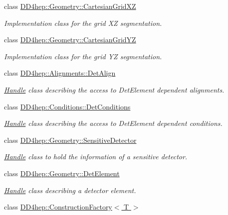 \begin{DoxyCompactItemize}
class \hyperlink{class_d_d4hep_1_1_geometry_1_1_cartesian_grid_x_z}{D\+D4hep\+::\+Geometry\+::\+Cartesian\+Grid\+XZ}
\begin{DoxyCompactList}\small\item\em Implementation class for the grid XZ segmentation. \end{DoxyCompactList}\item 
class \hyperlink{class_d_d4hep_1_1_geometry_1_1_cartesian_grid_y_z}{D\+D4hep\+::\+Geometry\+::\+Cartesian\+Grid\+YZ}
\begin{DoxyCompactList}\small\item\em Implementation class for the grid YZ segmentation. \end{DoxyCompactList}\item 
class \hyperlink{class_d_d4hep_1_1_alignments_1_1_det_align}{D\+D4hep\+::\+Alignments\+::\+Det\+Align}
\begin{DoxyCompactList}\small\item\em \hyperlink{class_d_d4hep_1_1_handle}{Handle} class describing the access to Det\+Element dependent alignments. \end{DoxyCompactList}\item 
class \hyperlink{class_d_d4hep_1_1_conditions_1_1_det_conditions}{D\+D4hep\+::\+Conditions\+::\+Det\+Conditions}
\begin{DoxyCompactList}\small\item\em \hyperlink{class_d_d4hep_1_1_handle}{Handle} class describing the access to Det\+Element dependent conditions. \end{DoxyCompactList}\item 
class \hyperlink{class_d_d4hep_1_1_geometry_1_1_sensitive_detector}{D\+D4hep\+::\+Geometry\+::\+Sensitive\+Detector}
\begin{DoxyCompactList}\small\item\em \hyperlink{class_d_d4hep_1_1_handle}{Handle} class to hold the information of a sensitive detector. \end{DoxyCompactList}\item 
class \hyperlink{class_d_d4hep_1_1_geometry_1_1_det_element}{D\+D4hep\+::\+Geometry\+::\+Det\+Element}
\begin{DoxyCompactList}\small\item\em \hyperlink{class_d_d4hep_1_1_handle}{Handle} class describing a detector element. \end{DoxyCompactList}\item 
class \hyperlink{class_d_d4hep_1_1_construction_factory}{D\+D4hep\+::\+Construction\+Factory$<$ T $>$}

\end{DoxyCompactItemize}
